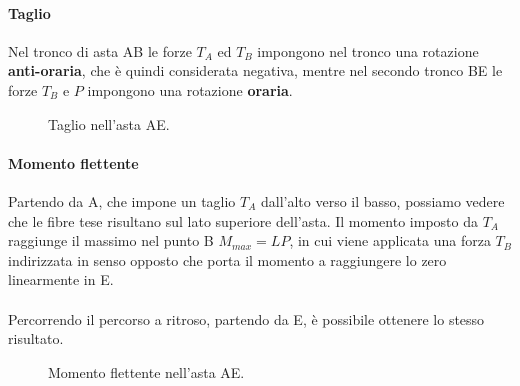 \documentclass[main.tex]{subfiles}
\begin{document}
\paragraph{Taglio} Nel tronco di asta AB le forze $T_A$ ed $T_B$ impongono nel tronco una rotazione \textbf{anti-oraria}, che è quindi considerata negativa, mentre nel secondo tronco BE le forze $T_B$ e $P$ impongono una rotazione \textbf{oraria}.

\begin{figure}[H]
\centering
\resizebox{.5\textwidth}{!}{}
\caption{Taglio nell'asta AE.}
\end{figure}

\paragraph{Momento flettente} Partendo da A, che impone un taglio $T_A$ dall'alto verso il basso, possiamo vedere che le fibre tese risultano sul lato superiore dell'asta. Il momento imposto da $T_A$ raggiunge il massimo nel punto B $M_{max} = LP$, in cui viene applicata una forza $T_B$ indirizzata in senso opposto che porta il momento a raggiungere lo zero linearmente in E.
\\
\\
Percorrendo il percorso a ritroso, partendo da E, è possibile ottenere lo stesso risultato.

\begin{figure}[H]
\centering
\resizebox{.5\textwidth}{!}{}
\caption{Momento flettente nell'asta AE.}
\end{figure}
\end{document}
